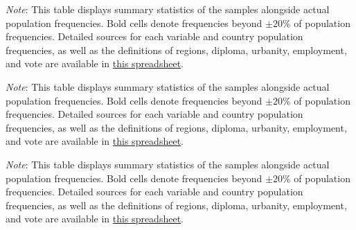 \begin{table}[h!]
    \caption[Sample representativeness in FR, DE, IT]{Sample representativeness in France, Germany, Italy. %
    } \label{tab:representativeness_1}
    \makebox[\textwidth][c]{
        \resizebox*{!}{.60\textheight}{%
        
        }
    }
    {\footnotesize \textit{Note}: This table displays summary statistics of the samples alongside actual population frequencies. Bold cells denote frequencies beyond $\pm 20\%$ of population frequencies. 
    Detailed sources for each variable and country population frequencies, as well as the definitions of regions, diploma, urbanity, employment, and vote are available in \href{https://github.com/bixiou/robustness_global_redistr/raw/main/questionnaire/sources.xlsx}{this spreadsheet}. 
    } 
\end{table}

\begin{table}[h!]
    \caption[Sample representativeness in PL, ES, GB, CH]{Sample representativeness in Poland, Spain, the UK, Switzerland. %
    } \label{tab:representativeness_2}
    \makebox[\textwidth][c]{\resizebox*{!}{.60\textheight}{}}
    {\footnotesize \textit{Note}: This table displays summary statistics of the samples alongside actual population frequencies. Bold cells denote frequencies beyond $\pm 20\%$ of population frequencies. 
    Detailed sources for each variable and country population frequencies, as well as the definitions of regions, diploma, urbanity, employment, and vote are available in \href{https://github.com/bixiou/robustness_global_redistr/raw/main/questionnaire/sources.xlsx}{this spreadsheet}. 
    } 
\end{table}

\begin{table}[h!]
    \caption[Sample representativeness in JP, SA, US]{Sample representativeness in Japan, Saudi Arabia, the United States. %
    } \label{tab:representativeness_3}
    \makebox[\textwidth][c]{\resizebox*{!}{.80\textheight}{}}
    {\footnotesize \textit{Note}: This table displays summary statistics of the samples alongside actual population frequencies. Bold cells denote frequencies beyond $\pm 20\%$ of population frequencies. 
    Detailed sources for each variable and country population frequencies, as well as the definitions of regions, diploma, urbanity, employment, and vote are available in \href{https://github.com/bixiou/robustness_global_redistr/raw/main/questionnaire/sources.xlsx}{this spreadsheet}. 
    } 
\end{table}
\clearpage
